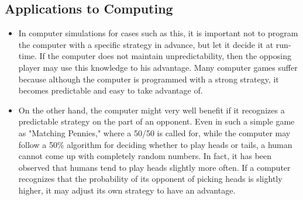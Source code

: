 \documentclass[a4paper,12pt]{article}
\begin{document}
\subsection{Applications to Computing}
\begin{itemize}
\item In computer simulations for cases such as this, it is important not to program the computer with a specific strategy in advance, but let it decide it at run-time. If the computer does not maintain unpredictability, then the opposing player may use this knowledge to his advantage. Many computer games suffer because although the computer is programmed with a strong strategy, it becomes predictable and easy to take advantage of.
\item 
On the other hand, the computer might very well benefit if it recognizes a predictable strategy on the part of an opponent. Even in such a simple game as "Matching Pennies," where a 50/50 is called for, while the computer may follow a 50\% algorithm for deciding whether to play heads or tails, a human cannot come up with completely random numbers. In fact, it has been observed that humans tend to play heads slightly more often. If a computer recognizes that the probability of its opponent of picking heads is slightly higher, it may adjust its own strategy to have an advantage.
\end{itemize}
\end{document}
